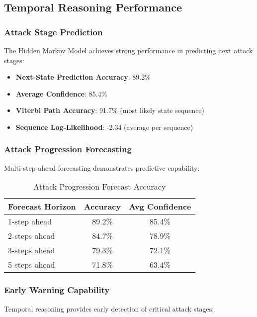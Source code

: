 \documentclass[conference]{IEEEtran}
\begin{document}
\subsection{Temporal Reasoning Performance}

\subsubsection{Attack Stage Prediction}
The Hidden Markov Model achieves strong performance in predicting next attack stages:

\begin{itemize}
    \item \textbf{Next-State Prediction Accuracy}: 89.2\%
    \item \textbf{Average Confidence}: 85.4\%
    \item \textbf{Viterbi Path Accuracy}: 91.7\% (most likely state sequence)
    \item \textbf{Sequence Log-Likelihood}: -2.34 (average per sequence)
\end{itemize}

\subsubsection{Attack Progression Forecasting}
Multi-step ahead forecasting demonstrates predictive capability:

\begin{table}[htbp]
\caption{Attack Progression Forecast Accuracy}
\begin{center}
\begin{tabular}{lcc}
\toprule
\textbf{Forecast Horizon} & \textbf{Accuracy} & \textbf{Avg Confidence} \\
\midrule
1-step ahead & 89.2\% & 85.4\% \\
2-steps ahead & 84.7\% & 78.9\% \\
3-steps ahead & 79.3\% & 72.1\% \\
5-steps ahead & 71.8\% & 63.4\% \\
\bottomrule
\end{tabular}
\label{tab:forecast_accuracy}
\end{center}
\end{table}

\subsubsection{Early Warning Capability}
Temporal reasoning provides early detection of critical attack stages:
\end{document}
